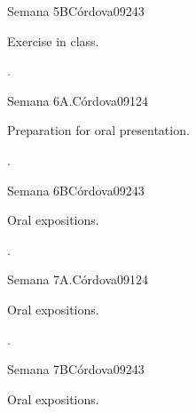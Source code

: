 \begin{syllabus}
\begin{unit}{}{Semana 5B}{Córdova09}{24}{3}
   \begin{topics}
      \item Exercise in class.
   \end{topics}

   \begin{learningoutcomes}
      \item . 
      \end{learningoutcomes}
\end{unit}

\begin{unit}{}{Semana 6A.}{Córdova09}{12}{4}
   \begin{topics}
      \item Preparation for oral presentation. 
   \end{topics}
   \begin{learningoutcomes}
      \item .
   \end{learningoutcomes}
\end{unit}

\begin{unit}{}{Semana 6B}{Córdova09}{24}{3}
   \begin{topics}
      \item Oral expositions.
   \end{topics}

   \begin{learningoutcomes}
      \item .
      \end{learningoutcomes}
\end{unit}


\begin{unit}{}{Semana 7A.}{Córdova09}{12}{4}
   \begin{topics}
      \item Oral expositions.
   \end{topics}
   \begin{learningoutcomes}
      \item .
   \end{learningoutcomes}
\end{unit}

\begin{unit}{}{Semana 7B}{Córdova09}{24}{3}
   \begin{topics}
      \item Oral expositions.
   \end{topics}


\end{unit}
\end{syllabus}

